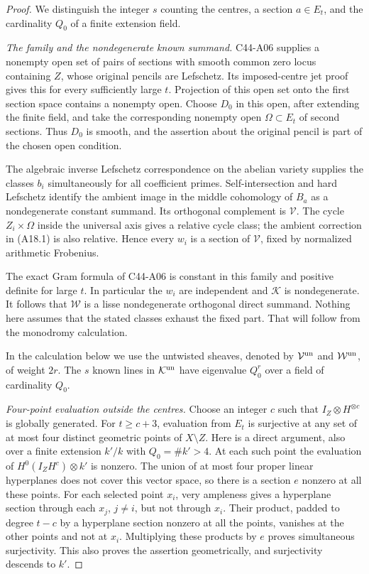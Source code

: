 \documentclass[11pt]{article}
\theoremstyle{remark}\newtheorem{remark}[theorem]{Remark}
\begin{document}
\begin{proof}
We distinguish the integer $s$ counting the centres, a section
$a\in E_t$, and the cardinality $Q_0$ of a finite extension field.

\emph{The family and the nondegenerate known summand.}
C44-A06 supplies a nonempty open set of pairs of sections with
smooth common zero locus containing $Z$, whose original pencils
are Lefschetz. Its imposed-centre jet proof gives this for every
sufficiently large $t$. Projection of this open set onto the first
section space contains a nonempty open. Choose $D_0$ in this open,
after extending the finite field, and take the corresponding
nonempty open $\Omega\subset E_t$ of second sections. Thus $D_0$
is smooth, and the assertion about the original pencil is part of
the chosen open condition.

The algebraic inverse Lefschetz correspondence on the abelian
variety supplies the classes $b_i$ simultaneously for all
coefficient primes. Self-intersection and hard Lefschetz identify
the ambient image in the middle cohomology of $B_a$ as a
nondegenerate constant summand. Its orthogonal complement is
$\mathcal V$. The cycle $Z_i\times\Omega$ inside the universal
axis gives a relative cycle class; the ambient correction in
(A18.1) is also relative. Hence every $w_i$ is a section of
$\mathcal V$, fixed by normalized arithmetic Frobenius.

The exact Gram formula of C44-A06 is constant in this family and
positive definite for large $t$. In particular the $w_i$ are
independent and $\mathcal K$ is nondegenerate. It follows that
$\mathcal W$ is a lisse nondegenerate orthogonal direct summand.
Nothing here assumes that the stated classes exhaust the fixed
part. That will follow from the monodromy calculation.

In the calculation below we use the untwisted sheaves, denoted by
$\mathcal V^{\rm un}$ and $\mathcal W^{\rm un}$, of weight $2r$.
The $s$ known lines in $\mathcal K^{\rm un}$ have eigenvalue
$Q_0^r$ over a field of cardinality $Q_0$.

\emph{Four-point evaluation outside the centres.}
Choose an integer $c$ such that $I_Z\otimes H^{\otimes c}$ is
globally generated. For $t\geq c+3$, evaluation from $E_t$ is
surjective at any set of at most four distinct geometric points
of $X\setminus Z$. Here is a direct argument, also over a finite
extension $k'/k$ with $Q_0=\#k'>4$. At each such point the
evaluation of $H^0(I_ZH^c)\otimes k'$ is nonzero. The union of at
most four proper linear hyperplanes does not cover this vector
space, so there is a section $e$ nonzero at all these points.
For each selected point $x_i$, very ampleness gives a hyperplane
section through each $x_j$, $j\ne i$, but not through $x_i$.
Their product, padded to degree $t-c$ by a hyperplane section
nonzero at all the points, vanishes at the other points and not
at $x_i$. Multiplying these products by $e$ proves simultaneous
surjectivity. This also proves the assertion geometrically, and
surjectivity descends to $k'$.


\end{proof}
\end{document}
